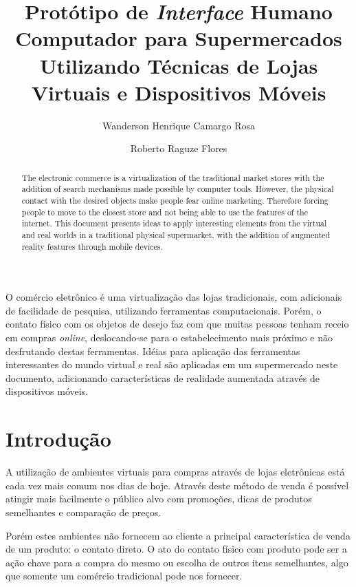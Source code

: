 \documentclass{article}
\title{Protótipo de \emph{Interface} Humano Computador para Supermercados
Utilizando Técnicas de Lojas Virtuais e Dispositivos Móveis}
\author{Wanderson Henrique Camargo Rosa\inst{1} \and Roberto Raguze
Flores\inst{1}}
\begin{document}
\maketitle{}

\begin{abstract}
The electronic commerce is a virtualization of the traditional market stores
with the addition of search mechanisms made possible by computer tools. However,
the physical contact with the desired objects make people fear online marketing.
Therefore forcing people to move to the closest store and not being able to use
the features of the internet. This document presents ideas to apply interesting
elements from the virtual and real worlds in a traditional physical supermarket,
with the addition of augmented reality features through mobile devices.
\end{abstract}

\begin{resumo}
O comércio eletrônico é uma virtualização das lojas tradicionais, com adicionais
de facilidade de pesquisa, utilizando ferramentas computacionais. Porém, o
contato físico com os objetos de desejo faz com que muitas pessoas tenham receio
em compras \emph{online}, deslocando-se para o estabelecimento mais próximo e
não desfrutando destas ferramentas. Idéias para aplicação das ferramentas
interessantes do mundo virtual e real são aplicadas em um supermercado neste
documento, adicionando características de realidade aumentada através de
dispositivos móveis.
\end{resumo}

\section{Introdução}
\label{sec:introducao}


A utilização de ambientes virtuais para compras através de lojas eletrônicas
está cada vez mais comum nos dias de hoje. Através deste método de venda é
possível atingir mais facilmente o público alvo com promoções, dicas de produtos
semelhantes e comparação de preços.


Porém estes ambientes não fornecem ao cliente a principal característica de
venda de um produto: o contato direto. O ato do contato físico com produto pode
ser a ação chave para a compra do mesmo ou escolha de outros itens semelhantes,
algo que somente um comércio tradicional pode nos fornecer.
\end{document}
